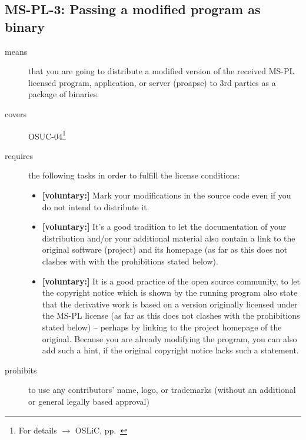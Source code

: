 \subsection{MS-PL-3: Passing a modified program as binary}

\begin{description}

\item[means] that you are going to distribute a modified version of the received
MS-PL licensed program, application, or server (proapse) to 3rd parties as a
package of binaries.

\item[covers] OSUC-04\footnote{For details $\rightarrow$ OSLiC, pp.\ \pageref{OSUC-04-DEF}}

\item[requires] the following tasks in order to fulfill the license conditions:
\begin{itemize}
  
  \item \textbf{[voluntary:]} Mark your modifications in the source code even if
  you do not intend to distribute it.
  
  \item \textbf{[voluntary:]} It's a good tradition to let the documentation of
  your distribution and/or your additional material also contain a link to the
  original software (project) and its homepage (as far as this does not clashes
  with with the prohibitions stated below).
  
  \item \textbf{[voluntary:]} It is a good practice of the open source
  community, to let the copyright notice which is shown by the running program
  also state that the derivative work is based on a version originally licensed
  under the MS-PL license (as far as this does not clashes with the prohibitions
  stated below) -- perhaps by linking to the project homepage of the original.
  Because you are already modifying the program, you can also add such a hint,
  if the original copyright notice lacks such a statement.
    
\end{itemize}

\item[prohibits] to use any contributors' name, logo, or trademarks (without an
additional or general legally based approval)

\end{description}



